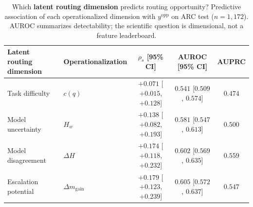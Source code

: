 \begin{table}[t]
  \centering
  \small
  \begin{tabular}{llccc}
    \toprule
    \textbf{Latent routing dimension} & \textbf{Operationalization} & $\rho_s$ [95\% CI] & AUROC [95\% CI] & AUPRC \\
    \midrule
    Task difficulty & $c(q)$ & $+0.071$ [$+0.015$, $+0.128$] & $0.541$ [$0.509$, $0.574$] & $0.474$ \\
    Model uncertainty & $H_w$ & $+0.138$ [$+0.082$, $+0.193$] & $0.581$ [$0.547$, $0.613$] & $0.500$ \\
    Model disagreement & $\Delta H$ & $+0.174$ [$+0.118$, $+0.232$] & $0.602$ [$0.569$, $0.635$] & $0.559$ \\
    Escalation potential & $\Delta m_{\mathrm{gain}}$ & $+0.179$ [$+0.123$, $+0.239$] & $0.605$ [$0.572$, $0.637$] & $0.547$ \\
  \end{tabular}
  \caption{Which \textbf{latent routing dimension} predicts routing opportunity? Predictive association of each operationalized dimension with $y^{\text{opp}}$ on ARC test ($n{=}1{,}172$). AUROC summarizes detectability; the scientific question is dimensional, not a feature leaderboard.}
  \label{tab:study2}
\end{table}
